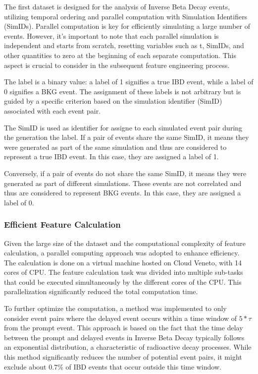 The first dataset is designed for the analysis of Inverse Beta Decay events, utilizing temporal ordering and parallel computation with Simulation Identifiers (SimIDs). Parallel computation is key for efficiently simulating a large number of events. However, it's important to note that each parallel simulation is independent and starts from scratch, resetting variables such as t, SimIDs, and other quantities to zero at the beginning of each separate computation. This aspect is crucial to consider in the subsequent feature engineering process.

The label is a binary value: a label of 1 signifies a true IBD event, while a label of 0 signifies a BKG event. The assignment of these labels is not arbitrary but is guided by a specific criterion based on the simulation identifier (SimID) associated with each event pair.

The SimID is used as identifier for assigne to each simulated event pair during the generation the label. If a pair of events share the same SimID, it means they were generated as part of the same simulation and thus are considered to represent a true IBD event. In this case, they are assigned a label of 1.

Conversely, if a pair of events do not share the same SimID, it means they were generated as part of different simulations. These events are not correlated and thus are considered to represent BKG events. In this case, they are assigned a label of 0.


\subsubsection*{Efficient Feature Calculation}
Given the large size of the dataset and the computational complexity of feature calculation, a parallel computing approach was adopted to enhance efficiency. The calculation is done on a virtual machine hosted on Cloud Veneto, with 14 cores of CPU. The feature calculation task was divided into multiple sub-tasks that could be executed simultaneously by the different cores of the CPU. This parallelization significantly reduced the total computation time.

To further optimize the computation, a method was implemented to only consider event pairs where the delayed event occurs within a time window of $5*\tau$ from the prompt event. This approach is based on the fact that the time delay between the prompt and delayed events in Inverse Beta Decay typically follows an exponential distribution, a characteristic of radioactive decay processes. While this method significantly reduces the number of potential event pairs, it might exclude about $0.7\%$ of IBD events that occur outside this time window. 

